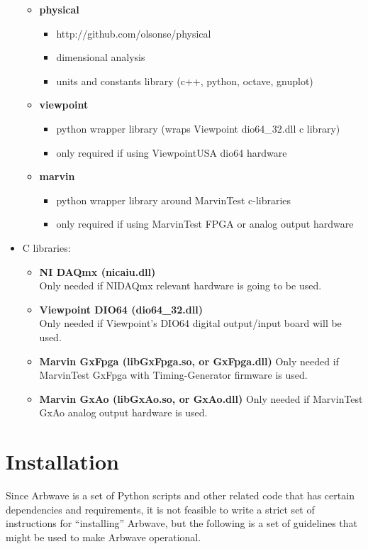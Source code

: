 \begin{itemize}
\begin{itemize}
      \item \textbf{physical}
        \begin{itemize}
          \item http://github.com/olsonse/physical
          \item dimensional analysis
          \item units and constants library (c++, python, octave, gnuplot)
        \end{itemize}

      \item \textbf{viewpoint}
        \begin{itemize}
          \item python wrapper library (wraps Viewpoint dio64\_32.dll c library)
          \item only required if using ViewpointUSA dio64 hardware
        \end{itemize}

      \item \textbf{marvin}
        \begin{itemize}
          \item python wrapper library around MarvinTest c-libraries
          \item only required if using MarvinTest FPGA or analog output hardware
        \end{itemize}
    \end{itemize}

  \item C libraries:
    \begin{itemize}
    \item \textbf{NI DAQmx (nicaiu.dll)} \\
      Only needed if NIDAQmx relevant hardware is going to be used.
    \item \textbf{Viewpoint DIO64 (dio64\_32.dll)} \\
      Only needed if Viewpoint's DIO64 digital output/input board will be used.
    \item \textbf{Marvin GxFpga (libGxFpga.so, or GxFpga.dll)}
      Only needed if MarvinTest GxFpga with  Timing-Generator
      firmware is used.
    \item \textbf{Marvin GxAo (libGxAo.so, or GxAo.dll)}
      Only needed if MarvinTest GxAo analog output hardware is used.
    \end{itemize}
\end{itemize}

\section{Installation}
Since Arbwave is a set of Python scripts and other related code that has certain 
dependencies and requirements,
it is not feasible to write a strict set of instructions for ``installing'' Arbwave,
but the following is a set of guidelines that might be used to make Arbwave operational.

